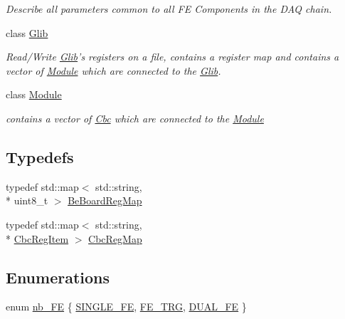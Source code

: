 \begin{DoxyCompactItemize}
\begin{DoxyCompactList}\small\item\em Describe all parameters common to all F\-E Components in the D\-A\-Q chain. \end{DoxyCompactList}\item 
class \hyperlink{class_ph2___hw_description_1_1_glib}{Glib}
\begin{DoxyCompactList}\small\item\em Read/\-Write \hyperlink{class_ph2___hw_description_1_1_glib}{Glib}'s registers on a file, contains a register map and contains a vector of \hyperlink{class_ph2___hw_description_1_1_module}{Module} which are connected to the \hyperlink{class_ph2___hw_description_1_1_glib}{Glib}. \end{DoxyCompactList}\item 
class \hyperlink{class_ph2___hw_description_1_1_module}{Module}
\begin{DoxyCompactList}\small\item\em contains a vector of \hyperlink{class_ph2___hw_description_1_1_cbc}{Cbc} which are connected to the \hyperlink{class_ph2___hw_description_1_1_module}{Module} \end{DoxyCompactList}\end{DoxyCompactItemize}
\subsection*{Typedefs}
\begin{DoxyCompactItemize}
\item 
typedef std\-::map$<$ std\-::string, \\*
uint8\-\_\-t $>$ \hyperlink{namespace_ph2___hw_description_a9b77ad2bbc2b144cdd4f1574b31eaa20}{Be\-Board\-Reg\-Map}
\item 
typedef std\-::map$<$ std\-::string, \\*
\hyperlink{struct_ph2___hw_description_1_1_cbc_reg_item}{Cbc\-Reg\-Item} $>$ \hyperlink{namespace_ph2___hw_description_a9a23b373068f169aa67ca1d22c9a6001}{Cbc\-Reg\-Map}
\end{DoxyCompactItemize}
\subsection*{Enumerations}
\begin{DoxyCompactItemize}
\item 
enum \hyperlink{namespace_ph2___hw_description_a891c19542f306c932b747f42fe48fc2b}{nb\-\_\-\-F\-E} \{ \hyperlink{namespace_ph2___hw_description_a891c19542f306c932b747f42fe48fc2baa30d72f6d58dc25b003fbf8bf56b3ace}{S\-I\-N\-G\-L\-E\-\_\-\-F\-E}, 
\hyperlink{namespace_ph2___hw_description_a891c19542f306c932b747f42fe48fc2ba6e0b877d015d017f61b07618e057c452}{F\-E\-\_\-\-T\-R\-G}, 
\hyperlink{namespace_ph2___hw_description_a891c19542f306c932b747f42fe48fc2bae3b57cb16641bb367bfc57a00315a4ca}{D\-U\-A\-L\-\_\-\-F\-E}
 \}
\end{DoxyCompactItemize}


